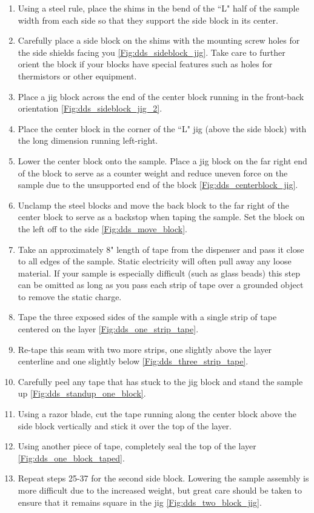 \begin{enumerate}
\item Using a steel rule, place the shims in the bend of the ``L" half of the sample width from each side so that they support the side block in its center.
\item Carefully place a side block on the shims with the mounting screw holes for the side shields facing you \ref{Fig:dds_sideblock_jig}. Take care to further orient the block if your blocks have special features such as holes for thermistors or other equipment.
\item Place a jig block across the end of the center block running in the front-back orientation \ref{Fig:dds_sideblock_jig_2}.
\item Place the center block in the corner of the ``L" jig (above the side block) with the long dimension running left-right.
\item Lower the center block onto the sample. Place a jig block on the far right end of the block to serve as a counter weight and reduce uneven force on the sample due to the unsupported end of the block \ref{Fig:dds_centerblock_jig}.
\item Unclamp the steel blocks and move the back block to the far right of the center block to serve as a backstop when taping the sample. Set the block on the left off to the side \ref{Fig:dds_move_block}.
\item Take an approximately 8" length of tape from the dispenser and pass it close to all edges of the sample. Static electricity will often pull away any loose material. If your sample is especially difficult (such as glass beads) this step can be omitted as long as you pass each strip of tape over a grounded object to remove the static charge.
\item Tape the three exposed sides of the sample with a single strip of tape centered on the layer \ref{Fig:dds_one_strip_tape}.
\item Re-tape this seam with two more strips, one slightly above the layer centerline and one slightly below \ref{Fig:dds_three_strip_tape}.
\item Carefully peel any tape that has stuck to the jig block and stand the sample up \ref{Fig:dds_standup_one_block}.
\item Using a razor blade, cut the tape running along the center block above the side block vertically and stick it over the top of the layer.
\item Using another piece of tape, completely seal the top of the layer \ref{Fig:dds_one_block_taped}.
\item Repeat steps 25-37 for the second side block. Lowering the sample assembly is more difficult due to the increased weight, but great care should be taken to ensure that it remains square in the jig \ref{Fig:dds_two_block_jig}.

\end{enumerate}
